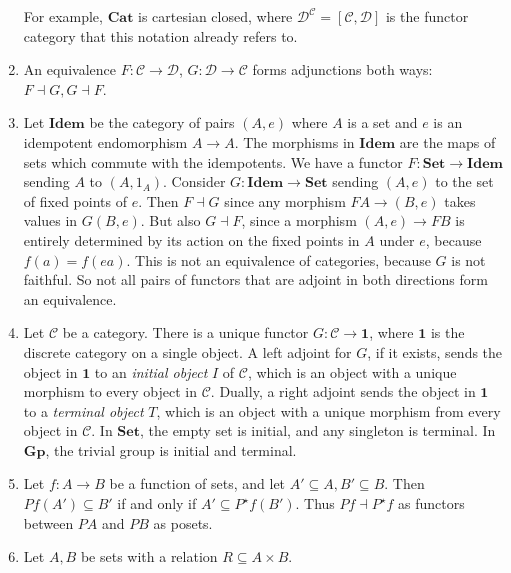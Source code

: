 \begin{example}
\begin{enumerate}
        For example, \( \mathbf{Cat} \) is cartesian closed, where \( \mathcal D^{\mathcal C} = [\mathcal C, \mathcal D] \) is the functor category that this notation already refers to.
        \item An equivalence \( F : \mathcal C \to \mathcal D \), \( G : \mathcal D \to \mathcal C \) forms adjunctions both ways: \( F \dashv G, G \dashv F \).
        \item Let \( \mathbf{Idem} \) be the category of pairs \( (A, e) \) where \( A \) is a set and \( e \) is an idempotent endomorphism \( A \to A \).
        The morphisms in \( \mathbf{Idem} \) are the maps of sets which commute with the idempotents.
        We have a functor \( F : \mathbf{Set} \to \mathbf{Idem} \) sending \( A \) to \( (A, 1_A) \).
        Consider \( G : \mathbf{Idem} \to \mathbf{Set} \) sending \( (A, e) \) to the set of fixed points of \( e \).
        Then \( F \dashv G \) since any morphism \( FA \to (B, e) \) takes values in \( G(B, e) \).
        But also \( G \dashv F \), since a morphism \( (A, e) \to FB \) is entirely determined by its action on the fixed points in \( A \) under \( e \), because \( f(a) = f(ea) \).
        This is not an equivalence of categories, because \( G \) is not faithful.
        So not all pairs of functors that are adjoint in both directions form an equivalence.
        \item Let \( \mathcal C \) be a category.
        There is a unique functor \( G : \mathcal C \to \mathbf 1 \), where \( \mathbf 1 \) is the discrete category on a single object.
        A left adjoint for \( G \), if it exists, sends the object in \( \mathbf 1 \) to an \emph{initial object} \( I \) of \( \mathcal C \), which is an object with a unique morphism to every object in \( \mathcal C \).
        Dually, a right adjoint sends the object in \( \mathbf 1 \) to a \emph{terminal object} \( T \), which is an object with a unique morphism from every object in \( \mathcal C \).
        In \( \mathbf{Set} \), the empty set is initial, and any singleton is terminal.
        In \( \mathbf{Gp} \), the trivial group is initial and terminal.
        \item Let \( f : A \to B \) be a function of sets, and let \( A' \subseteq A, B' \subseteq B \).
        Then \( Pf(A') \subseteq B' \) if and only if \( A' \subseteq P^\star f(B') \).
        Thus \( Pf \dashv P^\star f \) as functors between \( PA \) and \( PB \) as posets.
        \item Let \( A, B \) be sets with a relation \( R \subseteq A \times B \).

\end{enumerate}
\end{example}
